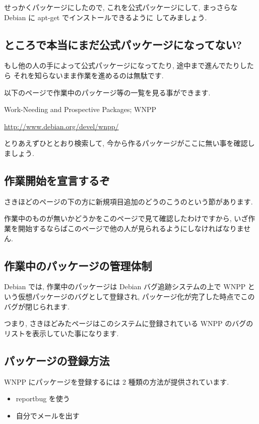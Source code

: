 \documentclass[mingoth,a4paper]{jsarticle}
\begin{document}
\begin{commandline}
せっかくパッケージにしたので, これを公式パッケージにして,
まっさらな Debian に apt-get でインストールできるように
してみましょう.

\subsection{ところで本当にまだ公式パッケージになってない?}

もし他の人の手によって公式パッケージになってたり, 途中まで進んでたりしたら
それを知らないまま作業を進めるのは無駄です.

以下のページで作業中のパッケージ等の一覧を見る事ができます.

\begin{center}
Work-Needing and Prospective Packages; WNPP

\url{http://www.debian.org/devel/wnpp/}
\end{center}

とりあえずひととおり検索して,
今から作るパッケージがここに無い事を確認しましょう.

\subsection{作業開始を宣言するぞ}

さきほどのページの下の方に新規項目追加のどうのこうのという節があります.

作業中のものが無いかどうかをこのページで見て確認したわけですから,
いざ作業を開始するならばこのページで他の人が見られるようにしなければなりません.

\subsection{作業中のパッケージの管理体制}

Debian では, 作業中のパッケージは Debian バグ追跡システムの上で
WNPP という仮想パッケージのバグとして登録され,
パッケージ化が完了した時点でこのバグが閉じられます.

つまり, さきほどみたページはこのシステムに登録されている
WNPP のバグのリストを表示していた事になります.

\subsection{パッケージの登録方法}

WNPP にパッケージを登録するには 2 種類の方法が提供されています.

\begin{itemize}
 \item reportbug を使う
 \item 自分でメールを出す
\end{itemize}


\end{commandline}
\end{document}
